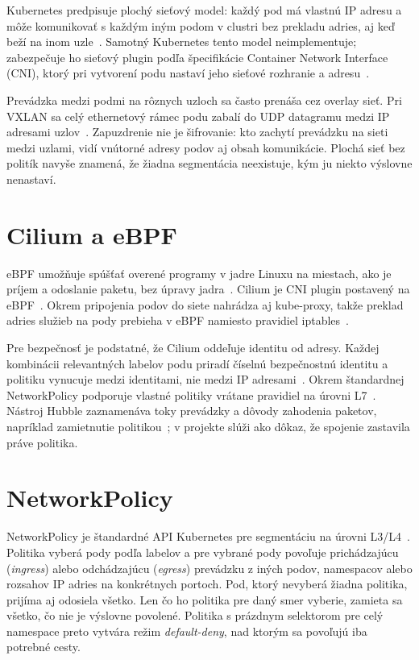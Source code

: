Kubernetes predpisuje plochý sieťový model: každý pod má vlastnú IP adresu a môže komunikovať s každým iným podom v clustri bez prekladu adries, aj keď beží na inom uzle~\cite{k8s-networking}. Samotný Kubernetes tento model neimplementuje; zabezpečuje ho sieťový plugin podľa špecifikácie Container Network Interface (CNI), ktorý pri vytvorení podu nastaví jeho sieťové rozhranie a adresu~\cite{cni-spec}.

Prevádzka medzi podmi na rôznych uzloch sa často prenáša cez overlay sieť. Pri VXLAN sa celý ethernetový rámec podu zabalí do UDP datagramu medzi IP adresami uzlov~\cite{rfc7348}. Zapuzdrenie nie je šifrovanie: kto zachytí prevádzku na sieti medzi uzlami, vidí vnútorné adresy podov aj obsah komunikácie. Plochá sieť bez politík navyše znamená, že žiadna segmentácia neexistuje, kým ju niekto výslovne nenastaví.

\section{Cilium a eBPF}
\label{sec:cilium}

eBPF umožňuje spúšťať overené programy v jadre Linuxu na miestach, ako je príjem a odoslanie paketu, bez úpravy jadra~\cite{ebpf-what}. Cilium je CNI plugin postavený na eBPF~\cite{cilium-docs}. Okrem pripojenia podov do siete nahrádza aj kube-proxy, takže preklad adries služieb na pody prebieha v eBPF namiesto pravidiel iptables~\cite{cilium-kpr}.

Pre bezpečnosť je podstatné, že Cilium oddeľuje identitu od adresy. Každej kombinácii relevantných labelov podu priradí číselnú bezpečnostnú identitu a politiku vynucuje medzi identitami, nie medzi IP adresami~\cite{cilium-identity}. Okrem štandardnej NetworkPolicy podporuje vlastné politiky vrátane pravidiel na úrovni L7~\cite{cilium-policy}. Nástroj Hubble zaznamenáva toky prevádzky a dôvody zahodenia paketov, napríklad zamietnutie politikou~\cite{hubble}; v projekte slúži ako dôkaz, že spojenie zastavila práve politika.

\section{NetworkPolicy}
\label{sec:networkpolicy}

NetworkPolicy je štandardné API Kubernetes pre segmentáciu na úrovni L3/L4~\cite{k8s-networkpolicy}. Politika vyberá pody podľa labelov a pre vybrané pody povoľuje prichádzajúcu (\emph{ingress}) alebo odchádzajúcu (\emph{egress}) prevádzku z iných podov, namespacov alebo rozsahov IP adries na konkrétnych portoch. Pod, ktorý nevyberá žiadna politika, prijíma aj odosiela všetko. Len čo ho politika pre daný smer vyberie, zamieta sa všetko, čo nie je výslovne povolené. Politika s prázdnym selektorom pre celý namespace preto vytvára režim \emph{default-deny}, nad ktorým sa povoľujú iba potrebné cesty.

